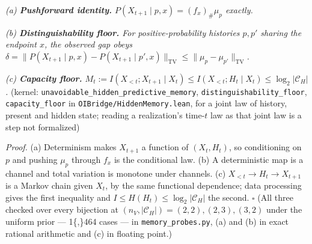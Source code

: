 \documentclass[
]{article}
\begin{document}
\emph{(a) \textbf{Pushforward identity.}
\(P(X_{t+1} \mid p, x) = (f_x)_\# \mu_p\) exactly.}

\emph{(b) \textbf{Distinguishability floor.} For positive-probability
histories \(p, p'\) sharing the endpoint \(x\), the observed gap obeys
\(\delta = \|P(X_{t+1} \mid p,x) - P(X_{t+1} \mid p',x)\|_{\mathrm{TV}} \leq \|\mu_p - \mu_{p'}\|_{\mathrm{TV}}\).}

\emph{(c) \textbf{Capacity floor.}
\(M_t := I(X_{<t}; X_{t+1} \mid X_t) \leq I(X_{<t}; H_t \mid X_t) \leq \log_2 |\mathcal{C}_H|\).}
(kernel: \texttt{unavoidable\_hidden\_predictive\_memory},
\texttt{distinguishability\_floor}, \texttt{capacity\_floor} in
\texttt{OIBridge/HiddenMemory.lean}, for a joint law of history, present
and hidden state; reading a realization's time-\(t\) law as that joint
law is a step not formalized)

\emph{Proof.} (a) Determinism makes \(X_{t+1}\) a function of
\((X_t, H_t)\), so conditioning on \(p\) and pushing \(\mu_p\) through
\(f_x\) is the conditional law. (b) A deterministic map is a channel and
total variation is monotone under channels. (c)
\(X_{<t} \to H_t \to X_{t+1}\) is a Markov chain given \(X_t\), by the
same functional dependence; data processing gives the first inequality
and \(I \leq H(H_t) \leq \log_2|\mathcal{C}_H|\) the second. \(\square\)
(All three checked over every bijection at
\((n_V, |\mathcal{C}_H|) = (2,2), (2,3), (3,2)\) under the uniform prior
--- 1\{,\}464 cases --- in \texttt{memory\_probes.py}, (a) and (b) in
exact rational arithmetic and (c) in floating point.)
\end{document}
